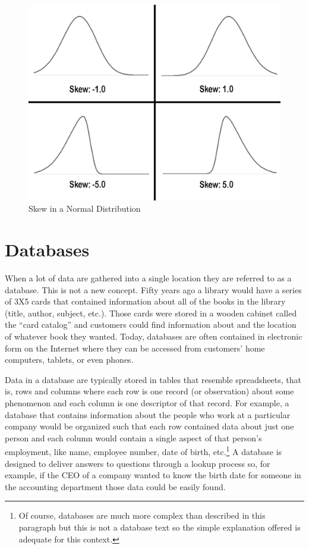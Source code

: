 \begin{figure}[H]
	\centering
	\includegraphics[width=\maxwidth{.95\linewidth}]{gfx/06-Skew}
	\caption{Skew in a Normal Distribution}
	\label{fig06.03}
\end{figure}

\section{Databases}

When a lot of data are gathered into a single location they are referred to as a \gls{database}. This is not a new concept. Fifty years ago a library would have a series of 3X5 cards that contained information about all of the books in the library (title, author, subject, etc.). Those cards were stored in a wooden cabinet called the ``card catalog'' and customers could find information about and the location of whatever book they wanted. Today, databases are often contained in electronic form on the Internet where they can be accessed from customers' home computers, tablets, or even phones.

Data in a database are typically stored in tables that resemble spreadsheets, that is, rows and columns where each row is one record (or observation) about some phenomenon and each column is one descriptor of that record. For example, a database that contains information about the people who work at a particular company would be organized such that each row contained data about just one person and each column would contain a single aspect of that person's employment, like name, employee number, date of birth, etc.\footnote{Of course, databases are much more complex than described in this paragraph but this is not a database text so the simple explanation offered is adequate for this context.} A database is designed to deliver answers to questions through a lookup process so, for example, if the CEO of a company wanted to know the birth date for someone in the accounting department those data could be easily found. 

